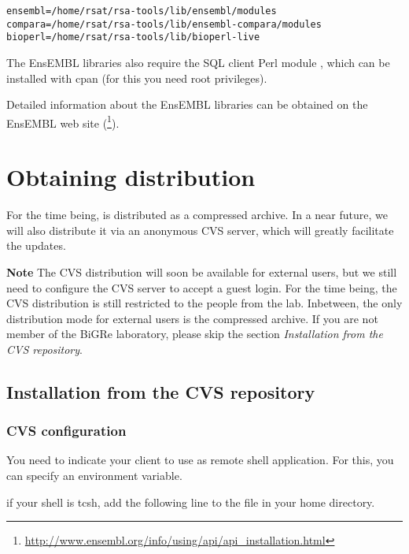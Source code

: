 \documentclass{book}
\begin{document}
\begin{footnotesize}
\begin{verbatim}
ensembl=/home/rsat/rsa-tools/lib/ensembl/modules
compara=/home/rsat/rsa-tools/lib/ensembl-compara/modules
bioperl=/home/rsat/rsa-tools/lib/bioperl-live
\end{verbatim}
\end{footnotesize}

The EnsEMBL libraries also require the SQL client Perl module
, which can be installed with cpan (for this you need
root privileges).

Detailed information about the EnsEMBL libraries can be obtained on
the EnsEMBL web site
(\footnote{\url{http://www.ensembl.org/info/using/api/api\_installation.html}}).

\chapter{Obtaining \RSAT distribution}

For the time being, \RSAT is distributed as a compressed archive. In a
near future, we will also distribute it via an anonymous CVS server,
which will greatly facilitate the updates.

\textbf{Note} The CVS distribution will soon be available for external
users, but we still need to configure the CVS server to accept a guest
login. For the time being, the CVS distribution is still restricted to
the people from the lab. Inbetween, the only distribution mode for
external users is the compressed archive. If you are not member of the
BiGRe laboratory, please skip the section \textit{Installation from
  the CVS repository}.

\section{Installation from the CVS repository}


\subsection{CVS configuration}

You need to indicate your  client to use 
as remote shell application. For this, you can specify an environment
variable.

if your shell is tcsh, add the following line to the 
file in your home directory.
\end{document}
